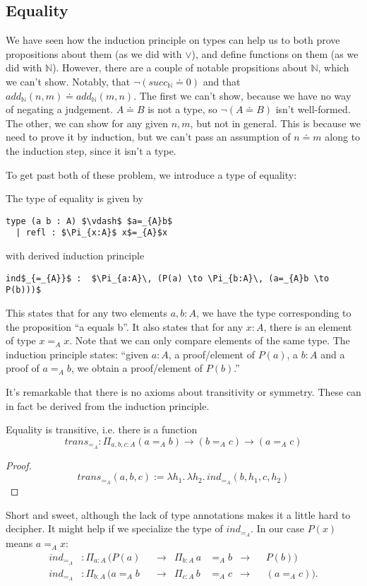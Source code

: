 \documentclass[a4paper, 12pt]{article}
\newcommand{\N}{\mathbb{N}}
\newcommand{\la}[1]{\lambda{#1}.\,}
\theoremstyle{changedot}
\theoremstyle{changedotbreak}
\theoremstyle{nonumberplain}
\newtheorem{proof}{Proof}
\begin{document}
\subsection{Equality}
We have seen how the induction principle on types can help us to both prove propositions about them (as we did with $\lor$), and define functions on them (as we did with $\N$). However, there are a couple of notable propsitions about $\N$, which we can't show. Notably, that $\neg(succ_{\N} \doteq 0)$ and that $add_{\N}(n, m) \doteq add_{\N}(m, n)$. The first we can't show, because we have no way of negating a judgement. $A \doteq B$ is not a type, so $\neg (A \doteq B)$ isn't well-formed. The other, we can show for any given $n, m$, but not in general. This is because we need to prove it by induction, but we can't pass an assumption of $n\doteq m$ along to the induction step, since it isn't a type.

To get past both of these problem, we introduce a type of equality:
\begin{definition}
  The type of equality is given by
\begin{lstlisting}[mathescape=true]
  type (a b : A) $\vdash$ $a=_{A}b$
  | refl : $\Pi_{x:A}$ x$=_{A}$x
\end{lstlisting}
  with derived induction principle  
\begin{lstlisting}
ind$_{=_{A}}$ :  $\Pi_{a:A}\, (P(a) \to \Pi_{b:A}\, (a=_{A}b \to P(b)))$
\end{lstlisting}
\end{definition}

This states that for any two elements $a, b : A$, we have the type corresponding to the proposition ``a equals b''. It also states that for any $x : A$, there is an element of type $x=_{A}x$. Note that we can only compare elements of the same type. The induction principle states: ``given $a:A$, a proof/element of $P(a)$, a $b:A$ and a proof of $a=_{A}b$, we obtain a proof/element of $P(b)$.''

It's remarkable that there is no axioms about transitivity or symmetry. These can in fact be derived from the induction principle.
\begin{theorem}
  Equality is transitive, i.e. there is a function
  \[trans_{=_{A}} : \Pi_{a, b, c : A} (a=_{A}b) \to (b=_{A}c) \to (a=_{A}c) \]
\end{theorem}
\begin{proof}
  \[trans_{=_{A}}(a, b, c) := \la{h_{1}} \la{h_{2}} ind_{=_{A}}(b, h_{1}, c, h_{2})\]
\end{proof}
Short and sweet, although the lack of type annotations makes it a little hard to decipher. It might help if we specialize the type of $ind_{=_{A}}$. In our case $P(x)$ means $a=_{A}x$:
\begin{align*}
  ind_{=_{A}} &: \Pi_{a:A}\, (P(a)& &\to& \Pi_{b:A}\, a&=_{A}b &\to& &P(b)) \\
  ind_{=_{A}} &: \Pi_{b:A}\, (a=_{A}b& &\to& \Pi_{c:A}\, b&=_{A}c &\to& &(a=_{A}c)).
\end{align*}
\end{document}
